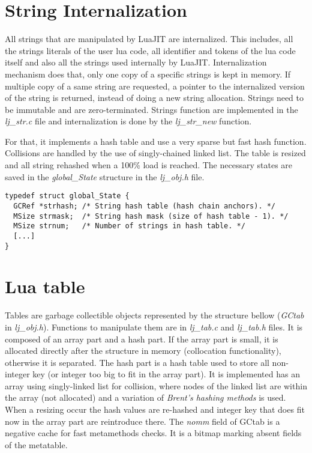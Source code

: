 
\section{String Internalization}
\label{Sec:string-inter}

All strings that are manipulated by LuaJIT are internalized. This includes, all
the strings literals of the user lua code, all identifier and tokens of the lua
code itself and also all the strings used internally by LuaJIT. Internalization
mechanism does that, only one copy of a specific strings is kept in memory. If
multiple copy of a same string are requested, a pointer to the internalized
version of the string is returned, instead of doing a new string allocation.
Strings need to be immutable and are zero-terminated. Strings function are
implemented in the \emph{lj\_str.c} file and internalization is done by the
\emph{lj\_str\_new} function.

For that, it implements a hash table and use a very sparse but fast hash
function. Collisions are handled by the use of singly-chained linked list.
The table is resized and all string rehashed when a 100\% load is reached.
The necessary states are saved in the \emph{global\_State} structure in the
\emph{lj\_obj.h} file.

\begin{lstlisting}[style=CStyle]
typedef struct global_State {
  GCRef *strhash; /* String hash table (hash chain anchors). */
  MSize strmask;  /* String hash mask (size of hash table - 1). */
  MSize strnum;   /* Number of strings in hash table. */
  [...]
}
\end{lstlisting}

\section{Lua table}
\label{Sec:table}

Tables are garbage collectible objects represented by the structure bellow
(\emph{GCtab} in \emph{lj\_obj.h}). Functions to manipulate them are in
\emph{lj\_tab.c} and \emph{lj\_tab.h} files. It is composed of an array part and
a hash part. If the array part is small, it is allocated directly after the
structure in memory (collocation functionality), otherwise it is separated. The
hash part is a hash table used to store all non-integer key (or integer too big
to fit in the array part). It is implemented has an array using singly-linked
list for collision, where nodes of the linked list are within the array (not
allocated) and a variation of \emph{Brent's hashing methods} is used. When a
resizing occur the hash values are re-hashed and integer key that does fit now
in the array part are reintroduce there. The \emph{nomm} field of GCtab is a
negative cache for fast metamethods checks. It is a bitmap marking absent fields
of the metatable.

